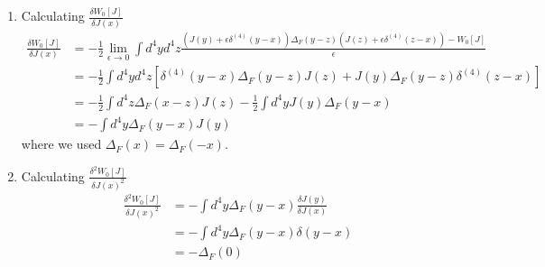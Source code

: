 \documentclass[10pt,a4paper]{article}
\theoremstyle{definition}
\begin{document}
\begin{enumerate}
\item Calculating $\frac{\delta W_0[J]}{\delta J(x)}$
\begin{align}
    \frac{\delta W_0[J]}{\delta J(x)}&=-\frac{1}{2}\lim_{\epsilon\rightarrow0}\int d^4yd^4z\frac{\left(J(y)+\epsilon\delta^{(4)}(y-x)\right)\Delta_F(y-z)\left(J(z)+\epsilon\delta^{(4)}(z-x)\right)-W_0[J]}{\epsilon}\\
    &=-\frac{1}{2}\int d^4yd^4z \left[\delta^{(4)}(y-x)\Delta_F(y-z)J(z)+J(y)\Delta_F(y-z)\delta^{(4)}(z-x)\right]\\
    &=-\frac{1}{2}\int d^4z\Delta_F(x-z)J(z)-\frac{1}{2}\int d^4yJ(y)\Delta_F(y-x)\\
    &=-\int d^4y\Delta_F(y-x)J(y)
\end{align}
where we used $\Delta_F(x)=\Delta_F(-x)$.
\item Calculating $\frac{\delta^2 W_0[J]}{\delta J(x)^2}$
\begin{align}
    \frac{\delta^2 W_0[J]}{\delta J(x)^2}
    &=-\int d^4y\Delta_F(y-x)\frac{\delta J(y)}{\delta J(x)}\\
    &=-\int d^4y\Delta_F(y-x)\delta(y-x)\\
    &=-\Delta_F(0)
\end{align}


\end{enumerate}
\end{document}

